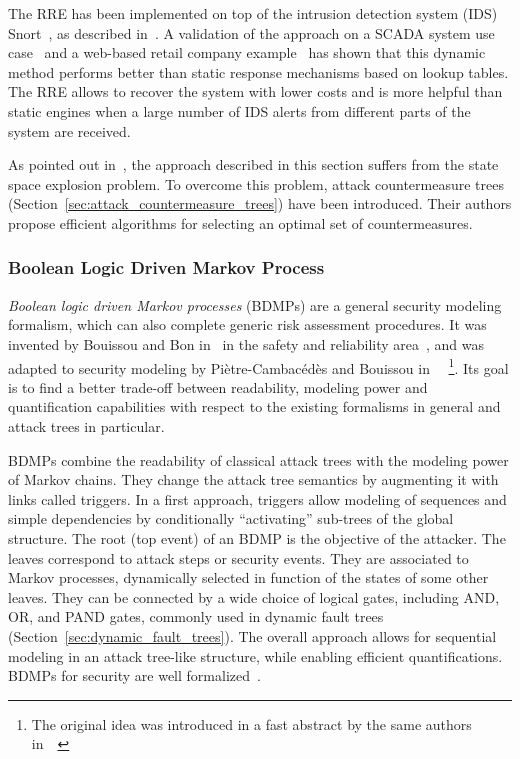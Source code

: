 \documentclass[a4paper]{article}
\begin{document}
The RRE has been implemented on top of the intrusion detection system (IDS)
Snort~, as described in~\cite{Zonouz}. A validation of the approach on a
SCADA system use case~\cite{ZoKhSaYa} and a web-based retail  company
example~\cite{ZoShRaKaPfAuIySaCo} has shown that this dynamic method  performs
better than static response mechanisms based on lookup tables. The RRE allows to
recover the system with lower costs and is more helpful than static engines when
a large number of IDS alerts from different parts of the system are received.

As pointed out in~\cite{RoKiTr}, the approach described in this section suffers
from the state space explosion problem. To overcome this problem, attack
countermeasure trees (Section~\ref{sec:attack_countermeasure_trees}) have been
introduced. Their authors propose efficient algorithms for selecting an optimal
set of countermeasures.
\subsubsection{Boolean Logic Driven Markov Process} 
\label{sec:BDMP}

\emph{Boolean logic driven Markov processes} (BDMPs) are a general security
modeling formalism, which can also complete generic risk assessment procedures.
It was invented by Bouissou and Bon in~ in the safety and reliability
area~\cite{BoBo}, and was adapted to security modeling by
Pi\`{e}tre-Cambac\'{e}d\`{e}s and Bouissou in~~\cite{PiBo6,PiBo2}
\footnote{The original idea was introduced in a fast abstract by the same
authors in~~\cite{PiBo3}}. Its goal is to find a better trade-off between
readability, modeling power and quantification capabilities with respect to the
existing formalisms in general and attack trees in particular.

BDMPs combine the readability of classical attack trees with the modeling power
of Markov chains. They change the attack tree semantics by augmenting it with
links called triggers. In a first approach, triggers allow modeling of sequences
and simple dependencies by conditionally ``activating'' sub-trees of the global
structure. The root (top event) of an BDMP is the objective of the attacker. The
leaves correspond to attack steps or security events. They are associated to
Markov processes, dynamically selected in function of the states of some other
leaves. They can be connected by a wide choice of logical gates, including AND,
OR, and PAND gates, commonly used in dynamic fault trees 
(Section~\ref{sec:dynamic_fault_trees}). The overall approach allows for
sequential modeling in an attack tree-like structure, while enabling efficient
quantifications. BDMPs for security are well formalized~\cite{PiBo2}.
\end{document}
